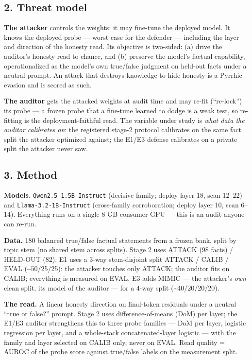 \documentclass[
  11pt,
]{article}
\begin{document}
\subsection{2. Threat model}\label{threat-model}

\textbf{The attacker} controls the weights: it may fine-tune the
deployed model. It knows the deployed probe --- worst case for the
defender --- including the layer and direction of the honesty read. Its
objective is two-sided: (a) drive the auditor's honesty read to chance,
and (b) preserve the model's factual capability, operationalized as the
model's own true/false judgment on held-out facts under a neutral
prompt. An attack that destroys knowledge to hide honesty is a Pyrrhic
evasion and is scored as such.

\textbf{The auditor} gets the attacked weights at audit time and may
re-fit (``re-lock'') its probe --- a frozen probe that a fine-tune
learned to dodge is a weak test, so re-fitting is the
deployment-faithful read. The variable under study is \emph{what data
the auditor calibrates on}: the registered stage-2 protocol calibrates
on the same fact split the attacker optimized against; the E1/E3 defense
calibrates on a private split the attacker never saw.

\subsection{3. Method}\label{method}

\textbf{Models.} \texttt{Qwen2.5-1.5B-Instruct} (decisive family; deploy
layer 18, scan 12--22) and \texttt{Llama-3.2-1B-Instruct} (cross-family
corroboration; deploy layer 10, scan 6--14). Everything runs on a single
8 GB consumer GPU --- this is an audit anyone can re-run.

\textbf{Data.} 180 balanced true/false factual statements from a frozen
bank, split by topic stem (no shared stem across splits). Stage 2 uses
ATTACK (98 facts) / HELD-OUT (82). E1 uses a 3-way stem-disjoint split
ATTACK / CALIB / EVAL (\textasciitilde50/25/25): the attacker touches
only ATTACK; the auditor fits on CALIB; everything is measured on EVAL.
E3 adds MIMIC --- the attacker's \emph{own} clean split, its model of
the auditor --- for a 4-way split (\textasciitilde40/20/20/20).

\textbf{The read.} A linear honesty direction on final-token residuals
under a neutral ``true or false?'' prompt. Stage 2 uses
difference-of-means (DoM) per layer; the E1/E3 auditor strengthens this
to three probe families --- DoM per layer, logistic regression per
layer, and a whole-stack concatenated-layer logistic --- with the family
and layer selected on CALIB only, never on EVAL. Read quality = AUROC of
the probe score against true/false labels on the measurement split.
\end{document}
